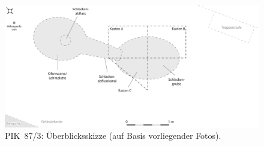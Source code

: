 \begin{figure}[p]
 \centering
 \includegraphics[width=\textwidth]{fig/PIK87-3_Skizze.pdf}
 \caption{PIK~87/3: Überblicksskizze (auf Basis vorliegender Fotos).}
 \label{fig:PIK87-3_Skizze}
\end{figure}

